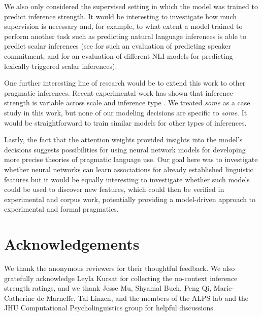 \documentclass[11pt,a4paper]{article}
\begin{document}
We also only considered the supervised setting in which the model was trained to predict inference strength. It would be interesting to investigate how much supervision is necessary and, for example, to what extent a model trained to perform another task such as predicting natural language inferences is able to predict scalar inferences (see  for such an evaluation of predicting speaker commitment, and  for an evaluation of different NLI models for predicting lexically triggered scalar inferences). 

One further interesting line of research would be to extend this work to other pragmatic inferences. Recent experimental work has shown that inference strength is variable across scale and inference type \citep{doran2012novel, van2016scalar}.  We treated \emph{some} as a case study in this work, but none of our modeling decisions are specific to \emph{some}. It would be straightforward to train similar models for other types of inferences.

Lastly, the fact that the attention weights  provided insights into the model's decisions suggests possibilities for using neural network models for developing more precise theories of pragmatic language use. Our goal here was to investigate whether neural networks can learn associations for already established linguistic features but it would be equally interesting to investigate whether such models could be used to discover new features, which could then be verified in experimental and corpus work, potentially providing a model-driven approach to experimental and formal pragmatics.  


\section*{Acknowledgements}
We thank the anonymous reviewers for their
thoughtful feedback. 
We also gratefully acknowledge Leyla Kursat for collecting the 
no-context inference strength ratings, and we thank Jesse Mu, Shyamal Buch, 
Peng Qi, Marie-Catherine de Marneffe, Tal Linzen, and the members of the 
ALPS lab and the JHU Computational Psycholinguistics group for helpful discussions.







\clearpage

\appendix

\onecolumn
\end{document}
